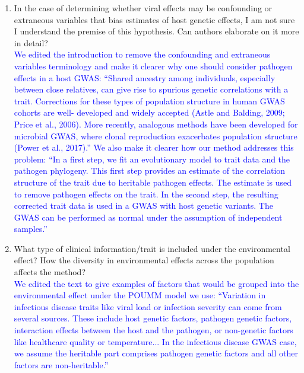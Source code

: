 \documentclass[11pt]{article}
\begin{document}
\begin{enumerate}
    \item In the case of determining whether viral effects may be confounding or extraneous variables that bias estimates of host genetic effects, I am not sure I understand the premise of this hypothesis. Can authors elaborate on it more in detail? \\
    \textcolor{blue}{We edited the introduction to remove the confounding and extraneous variables terminology and make it clearer why one should consider pathogen effects in a host GWAS: ``Shared ancestry among individuals, especially between close relatives, can give rise to spurious genetic correlations with a trait. Corrections for these types of population structure in human GWAS cohorts are well- developed and widely accepted (Astle and Balding, 2009; Price et al., 2006). More recently, analogous methods have been developed for microbial GWAS, where clonal reproduction exacerbates population structure (Power et al., 2017).'' We also make it clearer how our method addresses this problem: ``In a first step, we fit an evolutionary model to trait data and the pathogen phylogeny. This first step provides an estimate of the correlation structure of the trait due to heritable pathogen effects. The estimate is used to remove pathogen effects on the trait. In the second step, the resulting corrected trait data is used in a GWAS with host genetic variants. The GWAS can be performed as normal under the assumption of independent samples.''}
    \item What type of clinical information/trait is included under the environmental effect? How the diversity in environmental effects across the population affects the method? \\
    \textcolor{blue}{We edited the text to give examples of factors that would be grouped into the environmental effect under the POUMM model we use: ``Variation in infectious disease traits like viral load or infection severity can come from several sources. These include host genetic factors, pathogen genetic factors, interaction effects between the host and the pathogen, or non-genetic factors like healthcare quality or temperature... In the infectious disease GWAS case, we assume the heritable part comprises pathogen genetic factors and all other factors are non-heritable.''}
    

\end{enumerate}
\end{document}
